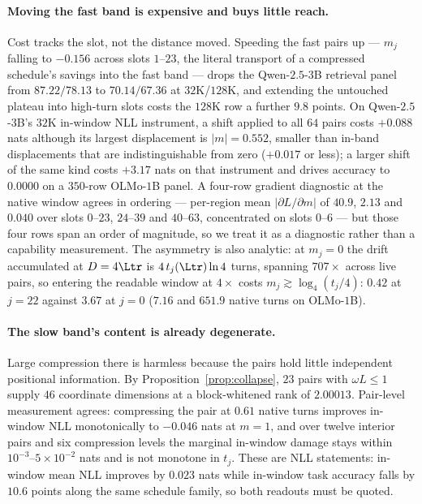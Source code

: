 \paragraph{Moving the fast band is expensive and buys little reach.}
Cost tracks the slot, not the distance moved. Speeding the fast pairs up --- $m_j$ falling to
$-0.156$ across slots $1$--$23$, the literal transport of a compressed schedule's savings into
the fast band --- drops the Qwen-$2.5$-$3$B retrieval panel from $87.22/78.13$ to $70.14/67.36$
at $32$K/$128$K, and extending the untouched plateau into high-turn slots costs the $128$K row a
further $9.8$ points. On Qwen-$2.5$-$3$B's $32$K in-window NLL instrument, a shift applied to
all $64$ pairs costs $+0.088$ nats although its largest displacement is $|m|=0.552$, smaller than
in-band displacements that are indistinguishable from zero ($+0.017$ or less); a larger shift of
the same kind costs $+3.17$ nats on that instrument and drives accuracy to $0.0000$ on a
$350$-row OLMo-$1$B panel. A four-row gradient
diagnostic at the native window agrees in ordering --- per-region mean $|\partial L/\partial m|$
of $40.9$, $2.13$ and $0.040$ over slots $0$--$23$, $24$--$39$ and $40$--$63$, concentrated on
slots $0$--$6$ --- but those four rows span an order of magnitude, so we treat it as a diagnostic
rather than a capability measurement. The asymmetry is also analytic: at $m_j=0$ the drift
accumulated at
$D=4\Ltr$ is $4\,t_j(\Ltr)\ln4$ turns, spanning $707\times$ across live pairs, so entering the
readable window at $4\times$ costs $m_j\gtrsim\log_4(t_j/4)$: $0.42$ at $j=22$ against $3.67$
at $j=0$ ($7.16$ and $651.9$ native turns on OLMo-$1$B).

\paragraph{The slow band's content is already degenerate.}
Large compression there is harmless because the pairs hold little independent positional
information. By Proposition~\ref{prop:collapse}, $23$ pairs with $\omega L\le1$ supply $46$
coordinate dimensions at a block-whitened rank of $2.00013$. Pair-level measurement agrees:
compressing the pair at $0.61$ native turns improves in-window NLL monotonically to $-0.046$
nats at $m=1$, and over twelve interior pairs and six compression levels the marginal in-window
damage stays within $10^{-3}$--$5\times10^{-2}$ nats and is not monotone in $t_j$. These are
NLL statements: in-window mean NLL improves by $0.023$ nats while in-window task accuracy falls
by $10.6$ points along the same schedule family, so both readouts must be quoted.

